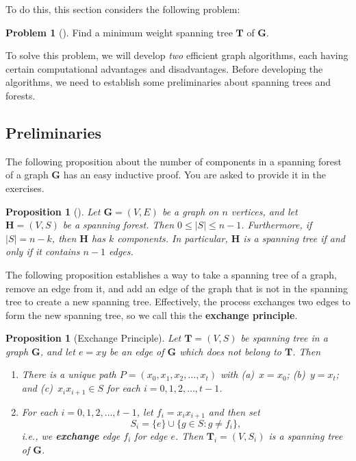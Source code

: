 \documentclass[10pt,]{book}
\newcommand{\terminology}[1]{\textbf{#1}}
\theoremstyle{plain}
\newtheorem{proposition}[theorem]{Proposition}
\theoremstyle{definition}
\theoremstyle{definition}
\theoremstyle{definition}
\newtheorem{problem}[theorem]{Problem}
\theoremstyle{definition}
\numberwithin{equation}{section}
\newcommand{\GVE}{\mathbf{G}=(V,E)}
\newcommand{\bfG}{\mathbf{G}}
\newcommand{\bfH}{\mathbf{H}}
\newcommand{\bfT}{\mathbf{T}}
\begin{document}
\hypertarget{p-153}{}%
To do this, this section considers the following problem:%
\begin{problem}[]\label{problem-1}
\hypertarget{p-154}{}%
Find a minimum weight spanning tree \(\bfT\) of \(\bfG\).%
\end{problem}
\hypertarget{p-155}{}%
To solve this problem, we will develop \emph{two} efficient graph algorithms, each having certain computational advantages and disadvantages. Before developing the algorithms, we need to establish some preliminaries about spanning trees and forests.%
\typeout{************************************************}
\typeout{************************************************}
\subsection[{Preliminaries}]{Preliminaries}\label{subsection-19}
\hypertarget{p-156}{}%
The following proposition about the number of components in a spanning forest of a graph \(\bfG\) has an easy inductive proof. You are asked to provide it in the exercises.%
\begin{proposition}[{}]\label{prop_graphalgorithms_spanforest}
\hypertarget{p-157}{}%
Let \(\GVE\) be a graph on \(n\) vertices, and let \(\bfH=(V,S)\) be a spanning forest. Then \(0\le |S|\le n-1\). Furthermore, if \(|S|= n-k\), then \(\bfH\) has \(k\) components. In particular, \(\bfH\) is a spanning tree if and only if it contains \(n-1\) edges.%
\end{proposition}
\hypertarget{p-158}{}%
The following proposition establishes a way to take a spanning tree of a graph, remove an edge from it, and add an edge of the graph that is not in the spanning tree to create a new spanning tree. Effectively, the process exchanges two edges to form the new spanning tree, so we call this the \terminology{exchange principle}.%
\begin{proposition}[{Exchange Principle}]\label{prop_graphalgorithms_exchange}
\hypertarget{p-159}{}%
Let \(\bfT=(V,S)\) be spanning tree in a graph \(\bfG\), and let \(e=xy\) be an edge of \(\bfG\) which does not belong to \(\bfT\). Then \leavevmode%
\begin{enumerate}
\item\hypertarget{li-41}{}\hypertarget{p-160}{}%
There is a \emph{unique} path \(P=(x_0,x_1,x_2,\dots,x_t)\) with (a)~\(x=x_0\); (b)~\(y=x_t\); and (c)~\(x_ix_{i+1}\in S\) for each \(i=0,1,2,\dots,t-1\).%
\item\hypertarget{li-42}{}\hypertarget{p-161}{}%
For each \(i=0,1,2,\dots,t-1\), let \(f_i=x_ix_{i+1}\) and then set%
\begin{equation*}
S_i = \{e\}\cup\{g\in S: g\neq f_i\},
\end{equation*}
i.e.\@, we \terminology{exchange} edge \(f_i\) for edge \(e\). Then \(\bfT_i=(V,S_i)\) is a spanning tree of \(\bfG\).%
\end{enumerate}
%
\end{proposition}
\end{document}
